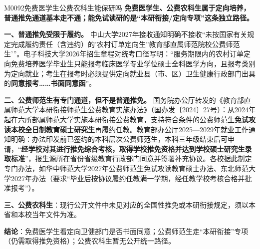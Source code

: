 \begin{qa}{M0092}{免费医学生公费农科生能保研吗}
\textbf{免费医学生、公费农科生属于定向培养，普通推免通道基本走不通；能免试读研的是“本研衔接/定向专项”这条独立路径。}

\textbf{一、普通推免受限于履约。} 中山大学2027年接收通知明确不接收“未按国家有关规定完成履约责任（含违约）的'农村订单定向生''教育部直属师范院校公费师范生'”。电子科技大学2026年招生章程对统考口径写明：“服务期限内的农村订单定向免费培养医学毕业生只能报考临床医学专业学位硕士全科医学方向，且报考类别为定向就业；考生在报考时必须提供定向就业县（市、区）卫生健康行政部门出具的\textbf{同意报考……书面同意函}”。

\textbf{二、公费师范生有专门通道，但不是普通推免。} 国务院办公厅转发的《教育部直属师范大学本研衔接师范生公费教育实施办法》（国办发〔2024〕27号）：从2024年起在六所部属师范大学实施本研衔接公费教育，支持符合条件的公费师范生\textbf{免试攻读本校全日制教育硕士研究生}再履约任教。教育部办公厅2025—2029年就业工作通知明确：办法印发前已签约的本科层次公费师范生，本科三年级结束后可申请，“\textbf{经学校对其进行推免综合考核，取得学校推免资格并达到学校硕士研究生录取标准}”，报生源所在省份省级教育行政部门同意并签署补充协议。各校据此制定专门办法，如华中师范大学2027年公费师范生免试攻读教育硕士办法、东北师范大学2027年办法（要求“毕业后按协议履约任教满一学期，经任教学校考核合格并批准报考”）。

\textbf{三、公费农科生}：现行公开文件中未见对应的全国性推免或本研衔接规定，须以本省和本校当年文件为准。

\textbf{结论}：免费医学生看定向卫健部门是否书面同意；公费师范生走“本研衔接”专项（仍需取得推免资格）；公费农科生暂无公开统一路径。
\end{qa}

